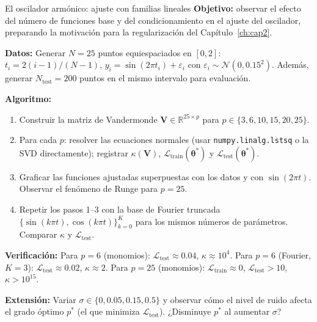 \begin{ejerciciocomp}{El oscilador armónico: ajuste con familias lineales}
\label{ejcomp:oscilador1}
\textbf{Objetivo:} observar el efecto del número de funciones base y del
condicionamiento en el ajuste del oscilador, preparando la motivación
para la regularización del Capítulo~\ref{ch:cap2}.

\medskip\noindent\textbf{Datos:}
Generar $N = 25$ puntos equiespaciados en $[0, 2]$:
$t_i = 2(i-1)/(N-1)$, $y_i = \sin(2\pi t_i) + \varepsilon_i$ con
$\varepsilon_i \sim \mathcal{N}(0, 0.15^2)$. Además, generar
$N_{\text{test}} = 200$ puntos en el mismo intervalo para evaluación.

\medskip\noindent\textbf{Algoritmo:}
\begin{enumerate}
  \item Construir la matriz de Vandermonde $\bm{V} \in
        \mathbb{R}^{25 \times p}$ para $p \in \{3, 6, 10, 15, 20, 25\}$.
  \item Para cada $p$: resolver las ecuaciones normales (usar
        \texttt{numpy.linalg.lstsq} o la SVD directamente); registrar
        $\kappa(\bm{V})$, $\mathcal{L}_{\text{train}}(\bm{\theta}^*)$
        y $\mathcal{L}_{\text{test}}(\bm{\theta}^*)$.
  \item Graficar las funciones ajustadas superpuestas con los datos y
        con $\sin(2\pi t)$. Observar el fenómeno de Runge para $p = 25$.
  \item Repetir los pasos 1--3 con la base de Fourier truncada
        $\{\sin(k\pi t), \cos(k\pi t)\}_{k=0}^{K}$ para los mismos
        números de parámetros. Comparar $\kappa$ y
        $\mathcal{L}_{\text{test}}$.
\end{enumerate}

\medskip\noindent\textbf{Verificación:}
Para $p = 6$ (monomios): $\mathcal{L}_{\text{test}} \approx 0.04$,
$\kappa \approx 10^4$.
Para $p = 6$ (Fourier, $K = 3$): $\mathcal{L}_{\text{test}} \approx
0.02$, $\kappa \approx 2$.
Para $p = 25$ (monomios): $\mathcal{L}_{\text{train}} \approx 0$,
$\mathcal{L}_{\text{test}} > 10$, $\kappa > 10^{15}$.

\medskip\noindent\textbf{Extensión:}
Variar $\sigma \in \{0, 0.05, 0.15, 0.5\}$ y observar cómo el
nivel de ruido afecta el grado óptimo $p^*$ (el que minimiza
$\mathcal{L}_{\text{test}}$). ¿Disminuye $p^*$ al aumentar $\sigma$?
\end{ejerciciocomp}

